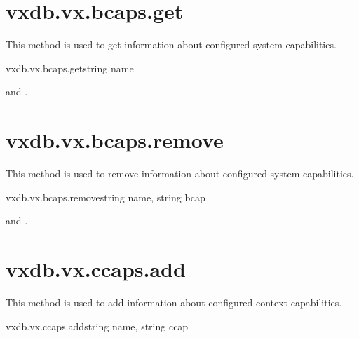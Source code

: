 \section{vxdb.vx.bcaps.get}

This method is used to get information about configured system capabilities.

\begin{rpcsynopsis}{vxdb.vx.bcaps.get}{string name}
\end{rpcsynopsis}

\begin{rpcaccess}
 and \rpcownerchecks.
\end{rpcaccess}


\rpcnoerrors


\section{vxdb.vx.bcaps.remove}

This method is used to remove information about configured system capabilities.

\begin{rpcsynopsis}{vxdb.vx.bcaps.remove}{string name, string bcap}
\end{rpcsynopsis}

\begin{rpcaccess}
 and \rpcownerchecks.
\end{rpcaccess}

\rpcreturnnil

\rpcnoerrors


\section{vxdb.vx.ccaps.add}

This method is used to add information about configured context capabilities.

\begin{rpcsynopsis}{vxdb.vx.ccaps.add}{string name, string ccap}
\end{rpcsynopsis}

